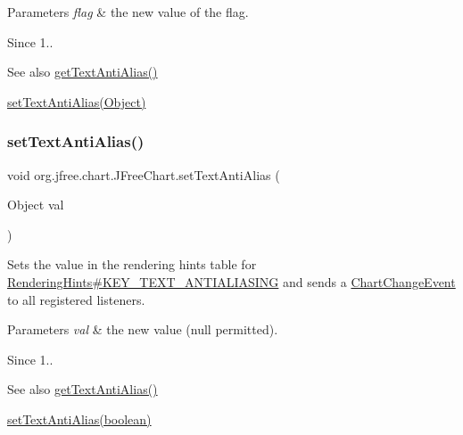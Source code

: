 \begin{DoxyParams}{Parameters}
{\em flag} & the new value of the flag.\\
\hline
\end{DoxyParams}
\begin{DoxySince}{Since}
1..
\end{DoxySince}
\begin{DoxySeeAlso}{See also}
\mbox{\hyperlink{classorg_1_1jfree_1_1chart_1_1_j_free_chart_a80d0c9c6238fbfc3a956f0bf382ab190}{get\+Text\+Anti\+Alias()}} 

\mbox{\hyperlink{classorg_1_1jfree_1_1chart_1_1_j_free_chart_a9a0b1e4d2667ad9e3def3c1e7ea9a94e}{set\+Text\+Anti\+Alias(\+Object)}} 
\end{DoxySeeAlso}
\mbox{\label{classorg_1_1jfree_1_1chart_1_1_j_free_chart_a9a0b1e4d2667ad9e3def3c1e7ea9a94e}} 
\subsubsection{\texorpdfstring{set\+Text\+Anti\+Alias()}{setTextAntiAlias()}\hspace{0.1cm}{\footnotesize\ttfamily [2/2]}}
{\footnotesize\ttfamily void org.\+jfree.\+chart.\+J\+Free\+Chart.\+set\+Text\+Anti\+Alias (\begin{DoxyParamCaption}\item[{Object}]{val }\end{DoxyParamCaption})}

Sets the value in the rendering hints table for \mbox{\hyperlink{}{Rendering\+Hints\#\+K\+E\+Y\+\_\+\+T\+E\+X\+T\+\_\+\+A\+N\+T\+I\+A\+L\+I\+A\+S\+I\+NG}} and sends a \mbox{\hyperlink{}{Chart\+Change\+Event}} to all registered listeners.


\begin{DoxyParams}{Parameters}
{\em val} & the new value ({\ttfamily null} permitted).\\
\hline
\end{DoxyParams}
\begin{DoxySince}{Since}
1..
\end{DoxySince}
\begin{DoxySeeAlso}{See also}
\mbox{\hyperlink{classorg_1_1jfree_1_1chart_1_1_j_free_chart_a80d0c9c6238fbfc3a956f0bf382ab190}{get\+Text\+Anti\+Alias()}} 

\mbox{\hyperlink{classorg_1_1jfree_1_1chart_1_1_j_free_chart_aedfada089f57c36fbd4c5ea025aacb7f}{set\+Text\+Anti\+Alias(boolean)}} 
\end{DoxySeeAlso}
\mbox{\label{classorg_1_1jfree_1_1chart_1_1_j_free_chart_a45064dfb45c9c2a7e6d2ebb8e71be884}} 
